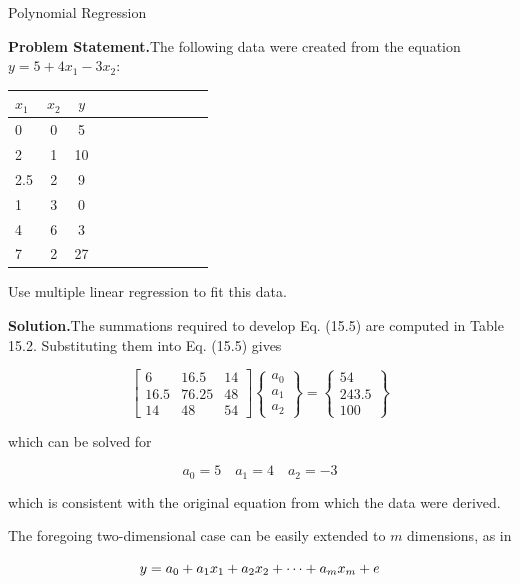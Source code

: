 \documentclass[../main.tex]{subfiles}
\begin{document}
\begin{example} Polynomial Regression

    \textbf{Problem Statement.}\quad The following data were created from the equation $y = 5 + 4x_1 - 3x_2$:

	\begin{tabular}{l c c c c c c c c c c}
		$x_1$ & $x_2$ & $y$ \\
		\hline
		0 & 0 & 5 \\
		2 & 1 & 10 \\
		2.5 & 2 & 9 \\
		1 & 3 & 0 \\
		4 & 6 & 3 \\
		7 & 2 & 27
  	\end{tabular}

	\noindent Use multiple linear regression to fit this data.

	\noindent\textbf{Solution.}\quad The summations required to develop Eq. (15.5) are computed in Table 15.2. Substituting them into Eq. (15.5) gives

	\begin{equation}
		\tag{15.6}
		\begin{bmatrix}
			6 & 16.5 & 14 \\
			16.5 & 76.25 & 48 \\
			14 & 48 & 54
		\end{bmatrix}
		\begin{Bmatrix}
			a_0 \\ a_1 \\ a_2
		\end{Bmatrix}
		=
		\begin{Bmatrix}
			54 \\ 243.5 \\ 100
		\end{Bmatrix}
	\end{equation}

	\noindent which can be solved for

	$$a_0 = 5 \quad a_1 = 4 \quad a_2 = -3$$

	\noindent which is consistent with the original equation from which the data were derived.
\end{example}

The foregoing two-dimensional case can be easily extended to $m$ dimensions, as in

\begin{equation}
	\notag
	y = a_0 + a_1 x_1 + a_2 x_2 + \cdots + a_m x_m + e
\end{equation}
\end{document}
